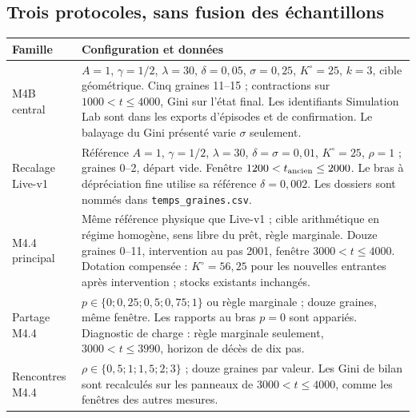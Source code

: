 \subsection{Trois protocoles, sans fusion des échantillons}
\begin{small}
\begin{longtable}{@{}p{.18\linewidth}p{.75\linewidth}@{}}
\toprule Famille & Configuration et données \\\midrule\endhead
M4B central & $A=1$, $\gamma=1/2$, $\lambda=30$, $\delta=0{,}05$,
$\sigma=0{,}25$, $K^\circ=25$, $k=3$, cible géométrique. Cinq graines
11--15 ; contractions sur $1000<t\le4000$, Gini sur l'état final.
Les identifiants Simulation Lab sont dans les exports d'épisodes et de
confirmation. Le balayage du Gini présenté varie $\sigma$ seulement. \\
Recalage Live-v1 & Référence $A=1$, $\gamma=1/2$, $\lambda=30$,
$\delta=\sigma=0{,}01$, $K^\circ=25$, $\rho=1$ ; graines 0--2,
départ vide. Fenêtre $1200<t_{\rm ancien}\le2000$.
Le bras à dépréciation fine utilise sa référence $\delta=0{,}002$.
Les dossiers sont nommés dans \texttt{temps\_graines.csv}. \\
M4.4 principal & Même référence physique que Live-v1 ; cible arithmétique
en régime homogène, sens libre du prêt, règle marginale. Douze graines
0--11, intervention au pas 2001, fenêtre $3000<t\le4000$.
Dotation compensée : $K^\circ=56{,}25$ pour les nouvelles entrantes
après intervention ; stocks existants inchangés. \\
Partage M4.4 & $p\in\{0;0{,}25;0{,}5;0{,}75;1\}$ ou règle marginale ;
douze graines, même fenêtre. Les rapports au bras $p=0$ sont appariés.
Diagnostic de charge : règle marginale seulement, $3000<t\le3990$,
horizon de décès de dix pas. \\
Rencontres M4.4 & $\rho\in\{0{,}5;1;1{,}5;2;3\}$ ; douze graines
par valeur. Les Gini de bilan sont recalculés sur les panneaux de
$3000<t\le4000$, comme les fenêtres des autres mesures. \\
\bottomrule
\end{longtable}
\end{small}

